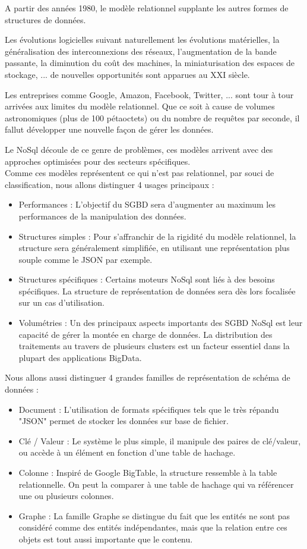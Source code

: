 \documentclass[a4paper,fleqn,12pt]{report}
\begin{document}
A partir des années 1980, le modèle relationnel supplante les autres formes de structures de données.

Les évolutions logicielles suivant naturellement les évolutions matérielles, la généralisation des interconnexions des réseaux, l'augmentation de la bande passante, la diminution du coût des machines, la miniaturisation des espaces de stockage, ... de nouvelles opportunités sont apparues au XXI siècle.

Les entreprises comme Google, Amazon, Facebook, Twitter, ... sont tour à tour arrivées aux limites du modèle relationnel. Que ce soit à cause de volumes astronomiques (plus de 100 pétaoctets) ou du nombre de requêtes par seconde, il fallut développer une nouvelle façon de gérer les données.

Le NoSql découle de ce genre de problèmes, ces modèles arrivent avec des approches optimisées pour des secteurs spécifiques. \\
Comme ces modèles représentent ce qui n'est pas relationnel, par souci de classification, nous allons distinguer 4 usages principaux :

\begin{itemize}
\item Performances : L'objectif du SGBD sera d'augmenter au maximum les performances de la manipulation des données. 
\item Structures simples : Pour s’affranchir de la rigidité du modèle relationnel, la structure sera généralement simplifiée, en utilisant une représentation plus souple comme le JSON par exemple.
\item Structures spécifiques : Certains moteurs NoSql sont liés à des besoins spécifiques. La structure de représentation de données sera dès lors focalisée sur un cas d'utilisation.
\item Volumétries : Un des principaux aspects importants des SGBD NoSql est leur capacité de gérer la montée en charge de données. La distribution des traitements au travers de plusieurs clusters est un facteur essentiel dans la plupart des applications BigData.
\end{itemize} 

Nous allons aussi distinguer 4 grandes familles de représentation de schéma de données :

\begin{itemize}
\item Document : L'utilisation de formats spécifiques tels que le très répandu "JSON" permet de stocker les données sur base de fichier.
\item Clé / Valeur : Le système le plus simple, il manipule des paires de clé/valeur, ou accède à un élément en fonction d'une table de hachage.
\item Colonne : Inspiré de Google BigTable, la structure ressemble à la table relationnelle. On peut la comparer à une table de hachage qui va référencer une ou plusieurs colonnes.
\item Graphe : La famille Graphe se distingue du fait que les entités ne sont pas considéré comme des entités indépendantes, mais que la relation entre ces objets est tout aussi importante que le contenu.
\end{itemize} 
\end{document}
